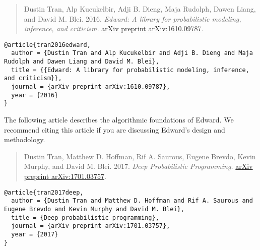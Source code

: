 \begin{quote}
Dustin Tran, Alp Kucukelbir, Adji B. Dieng, Maja Rudolph, Dawen Liang,
and David M. Blei.
2016.
\emph{Edward: A library for probabilistic modeling, inference, and criticism.}
\href{https://arxiv.org/abs/1610.09787}{arXiv preprint arXiv:1610.09787}.
\end{quote}

\begin{lstlisting}[class=JSON]
@article{tran2016edward,
  author = {Dustin Tran and Alp Kucukelbir and Adji B. Dieng and Maja Rudolph and Dawen Liang and David M. Blei},
  title = {{Edward: A library for probabilistic modeling, inference, and criticism}},
  journal = {arXiv preprint arXiv:1610.09787},
  year = {2016}
}
\end{lstlisting}

The following article describes the algorithmic foundations of Edward.
We recommend citing this article if you are discussing Edward's
design and methodology.

\begin{quote}
Dustin Tran, Matthew D. Hoffman, Rif A. Saurous, Eugene Brevdo, Kevin
Murphy, and David M. Blei.
2017.
\emph{Deep Probabilistic Programming.}
\href{https://arxiv.org/abs/1701.03757}{arXiv preprint arXiv:1701.03757}.
\end{quote}

\begin{lstlisting}[class=JSON]
@article{tran2017deep,
  author = {Dustin Tran and Matthew D. Hoffman and Rif A. Saurous and Eugene Brevdo and Kevin Murphy and David M. Blei},
  title = {Deep probabilistic programming},
  journal = {arXiv preprint arXiv:1701.03757},
  year = {2017}
}
\end{lstlisting}
